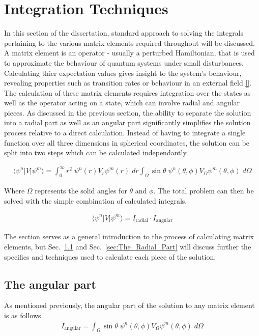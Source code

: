     \section{Integration Techniques} \label{sec:Integration_Techniques}
        In this section of the dissertation, standard approach to solving the integrals pertaining to the various matrix elements required throughout will be discussed. A matrix element is an operator - usually a perturbed Hamiltonian, that is used to approximate the behaviour of quantum systems under small disturbances. Calculating thier expectation values gives insight to the system's behaviour, revealing properties such as transition rates or behaviour in an external field \ref{}. The calculation of these matrix elements requires integration over the states as well as the operator acting on a state, which can involve radial and angular pieces. As discussed in the previous section, the ability to separate the solution into a radial part as well as an angular part significantly simplifies the solution process relative to a direct calculation. Instead of having to integrate a single function over all three dimensions in spherical coordinates, the solution can be split into two steps which can be calculated independantly.

        \begin{align}
            \langle \psi^n \vert V \vert \psi^m \rangle = \int_{0}^{\infty} r^2 \; \psi^n(r) V_r \psi^m(r) \; dr \int_\Omega \sin \theta \; \psi^n(\theta, \phi) V_\Omega \psi^m(\theta, \phi) \; d\Omega
        \end{align}

        Where $\Omega$ represents the solid angles for $\theta$ and $\phi$. The total problem can then be solved with the simple combination of calculated integrals.

        \begin{align}
             \langle \psi^n \vert V \vert \psi^m \rangle = I_{\text{radial}} \cdot I_{\text{angular}}
        \end{align}

        The section serves as a general introduction to the process of calculating matrix elements, but Sec.~\ref{sec:The_Angular_Part} and Sec.~\ref{sec:The_Radial_Part} will discuss further the specifics and techniques used to calculate each piece of the solution.

        \subsection{The angular part} \label{sec:The_Angular_Part}
        As mentioned previously, the angular part of the solution to any matrix element is as follows
        \begin{align}
            I_{\text{angular}} = \int_\Omega \sin \theta \; \psi^n(\theta, \phi) V_\Omega \psi^m(\theta, \phi) \; d\Omega \label{eq:hydrogen_spherical_harmonic}
        \end{align}

